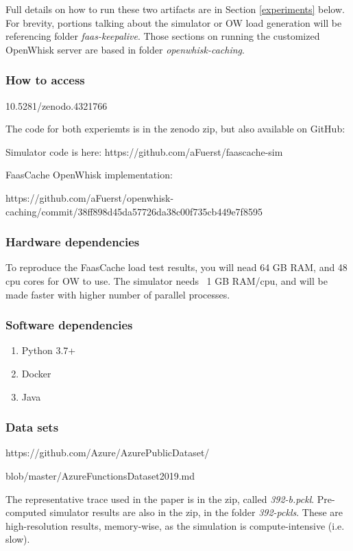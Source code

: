 {Full details on how to run these two artifacts are in Section \ref{experiments} below.
For brevity, portions talking about the simulator or OW load generation will be referencing folder {\em faas-keepalive}.
Those sections on running the customized OpenWhisk server are based in folder {\em openwhisk-caching}.

\subsubsection{How to access}

10.5281/zenodo.4321766

The code for both experiemts is in the zenodo zip, but also available on GitHub:

Simulator code is here:
https://github.com/aFuerst/faascache-sim

FaasCache OpenWhisk implementation:

https://github.com/aFuerst/openwhisk-caching/commit/38ff898d45da57726da38c00f735cb449e7f8595


\subsubsection{Hardware dependencies}

To reproduce the FaasCache load test results, you will nead 64 GB RAM, and 48 cpu cores for OW to use.
The simulator needs ~1 GB RAM/cpu, and will be made faster with higher number of parallel processes.


\subsubsection{Software dependencies}

\begin{enumerate}
  \item Python 3.7+
  \item Docker
  \item Java
\end{enumerate}


\subsubsection{Data sets} \label{data-sets}

https://github.com/Azure/AzurePublicDataset/

blob/master/AzureFunctionsDataset2019.md

The representative trace used in the paper is in the zip, called {\em 392-b.pckl}.
Pre-computed simulator results are also in the zip, in the folder {\em 392-pckls}. 
These are high-resolution results, memory-wise, as the simulation is compute-intensive (i.e. slow).

}
